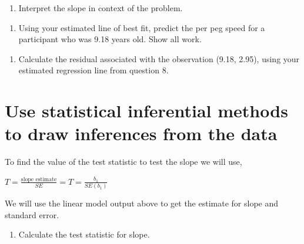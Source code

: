 \documentclass[
]{report}
\providecommand{\tightlist}{%
  \setlength{\itemsep}{0pt}\setlength{\parskip}{0pt}}
\begin{document}
\vspace{1in}

\begin{enumerate}
\def\labelenumi{\arabic{enumi}.}
\setcounter{enumi}{8}
\tightlist
\item
  Interpret the slope in context of the problem.
\end{enumerate}

\vspace{1in}

\begin{enumerate}
\def\labelenumi{\arabic{enumi}.}
\setcounter{enumi}{9}
\tightlist
\item
  Using your estimated line of best fit, predict the per peg speed for a participant who was 9.18 years old. Show all work.
\end{enumerate}

\vspace{1in}

\begin{enumerate}
\def\labelenumi{\arabic{enumi}.}
\setcounter{enumi}{10}
\tightlist
\item
  Calculate the residual associated with the observation (9.18, 2.95), using your estimated regression line from question 8.
\end{enumerate}

\vspace{1in}

\hypertarget{use-statistical-inferential-methods-to-draw-inferences-from-the-data-2}{%
\section{Use statistical inferential methods to draw inferences from the data}\label{use-statistical-inferential-methods-to-draw-inferences-from-the-data-2}}

To find the value of the test statistic to test the slope we will use,

\(T = \frac{\mbox{slope estimate}}{SE} = T = \frac{b_1}{SE(b_1)}\)

We will use the linear model output above to get the estimate for slope and standard error.

\begin{enumerate}
\def\labelenumi{\arabic{enumi}.}
\setcounter{enumi}{11}
\tightlist
\item
  Calculate the test statistic for slope.
\end{enumerate}

\vspace{1in}
\end{document}
